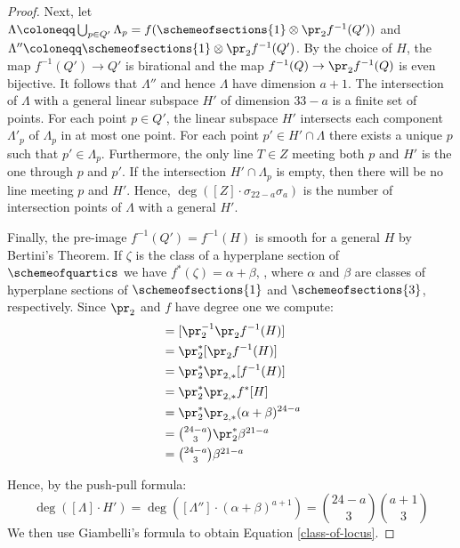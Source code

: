\begin{proof}
	Next, let $\Lambda \coloneqq \bigcup_{p\in Q'} \Lambda_p = f(\schemeofsections{1}\otimes \pr_2 f^{-1}(Q'))$ and $\Lambda''\coloneqq \schemeofsections{1}\otimes \pr_2 f^{-1}(Q')$. By the choice of $H$, the map $f^{-1}(Q')\to Q'$ is birational and the map $f^{-1}(Q)\to \pr_2f^{-1}(Q)$ is even bijective. It follows that $\Lambda''$ and hence $\Lambda$ have dimension $a+1$. The intersection of $\Lambda$ with a general linear subspace $H'$ of dimension $33-a$ is a finite set of points. For each point $p\in Q'$, the linear subspace $H'$ intersects each component $\Lambda'_p$ of $\Lambda_p$ in at most one point. For each point $p'\in H'\cap\Lambda$ there exists a unique $p$ such that $p'\in\Lambda_p$. Furthermore, the only line $T\in Z$ meeting both $p$ and $H'$ is the one through $p$ and $p'$. If the intersection $H'\cap \Lambda_p$ is empty, then there will be no line meeting $p$ and $H'$. Hence, $\deg([Z]\cdot \sigma_{22-a}\sigma_{a})$ is the number of intersection points of $\Lambda$ with a general $H'$.

	Finally, the pre-image $f^{-1}(Q') = f^{-1}(H)$ is smooth for a general $H$ by Bertini's Theorem. If $\zeta$ is the class of a hyperplane section of $\schemeofquartics$ we have $f^*(\zeta) = \alpha + \beta$, , where $\alpha$ and $\beta$ are classes of hyperplane sections of $\schemeofsections{1}$ and $\schemeofsections{3}$, respectively. Since $\pr_2$ and $f$ have degree one we compute:
	\begin{align*}
	[\Lambda''] & = [\pr_2^{-1}\pr_2 f^{-1}(H)] \\
	& = \pr_2^*[\pr_2 f^{-1}(H)] \\
	& = \pr_2^* \pr_{2,*}[f^{-1}(H)] \\
	& = \pr_2^*\pr_{2,*}f^*[H] \\
	& = \pr_2^* \pr_{2,*}(\alpha + \beta)^{24-a} \\
	& = \textstyle{\binom{24-a}{3}}\pr_2^* \beta^{21-a} \\
	& = \textstyle{\binom{24-a}{3}}\beta^{21-a}
	\end{align*}

	Hence, by the push-pull formula:
	\[
		\deg([\Lambda]\cdot H') = \deg([\Lambda'']\cdot(\alpha+\beta)^{a+1}) = \binom{24-a}{3}\binom{a+1}{3}
	\]
	We then use Giambelli's formula to obtain Equation \cref{class-of-locus}.




\end{proof}